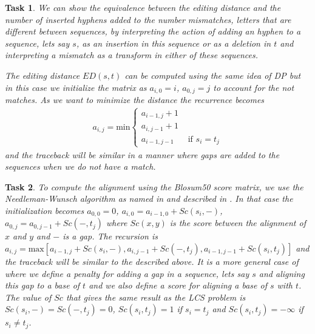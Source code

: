 \documentclass[11pt]{article} %
\theoremstyle{problemstyle}
\newtheorem{exercise}{Task}	%
\theoremstyle{problemstyle}
\begin{document}
\begin{exercise} %
We can show the equivalence between the editing distance and the number of inserted hyphens added to the number mismatches, letters that are  different between sequences, by interpreting the action of adding an hyphen to a sequence, lets say $s$, as an insertion in this sequence or as a deletion in $t$ and interpreting a mismatch as a transform in either of these sequences.

The editing distance $ED(s,t)$ can be computed using the same idea of DP but in this case we initialize the matrix as $a_{i,0} = i$, $a_{0,j} = j$ to account for the not matches. As we want to minimize the distance the recurrence becomes
\begin{align*}
a_{i,j}=\text{min}
\begin{cases}
a_{i-1,j}+1 &\\
a_{i,j-1}+1 &\\
a_{i-1,j-1} &\text{ if } s_i=t_j
\end{cases}
\end{align*}
and the traceback will be similar in a manner where gaps are added to the sequences when we do not have a match. 
\end{exercise}

\begin{exercise} %
	\begin{sloppypar}
To compute the alignment using the Blosum50 score matrix, we use the Needleman-Wunsch algorithm as named in \cite{durbin} and described in \cite{jones}. In that case the initialization becomes $a_{0,0}=0$, $a_{i,0} = a_{i-1,0} + Sc(s_i,-)$, $a_{0,j} = a_{0,j-1} + Sc(-,t_j)$ where $Sc(x,y)$ is the score between the alignment of $x$ and $y$ and $-$ is a gap. The recursion is ${
a_{i,j}=\text{max}[a_{i-1,j}+Sc(s_i,-), a_{i,j-1}+Sc(-,t_j),a_{i-1,j-1}+Sc(s_i,t_j)]}$
and the traceback will be similar to the described above. It is a more general case of  where we define a penalty for adding a gap in a sequence, lets say $s$ and aligning this gap to a base of $t$ and we also define a score for aligning a base of $s$ with $t$. The value of $Sc$ that gives the same result as the LCS problem is $Sc(s_i,-)=Sc(-,t_j)=0$, $Sc(s_i,t_j)=1$ if $s_i=t_j$ and $Sc(s_i,t_j)=-\infty$ if $s_i \neq t_j$.
	\end{sloppypar}
\end{exercise}
\end{document}
